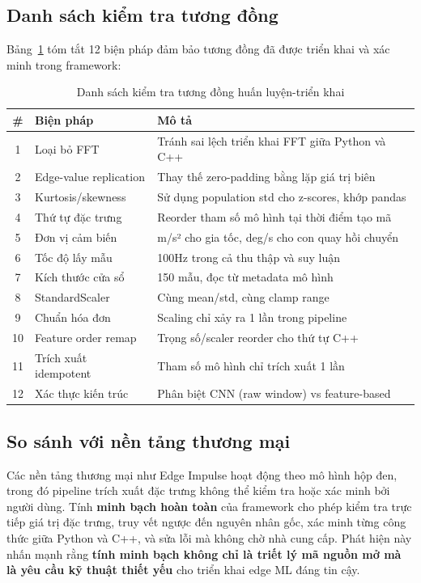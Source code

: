 \subsection{Danh sách kiểm tra tương đồng}
Bảng~\ref{tab:parity_checklist} tóm tắt 12 biện pháp đảm bảo tương đồng đã được triển khai và xác minh trong framework:

\begin{table}[H]
    \centering
    \caption{Danh sách kiểm tra tương đồng huấn luyện-triển khai}
    \small
    \begin{tabular}{@{}clp{7cm}@{}}
        \toprule
        \# & Biện pháp & Mô tả \\
        \midrule
        1 & Loại bỏ FFT & Tránh sai lệch triển khai FFT giữa Python và C++ \\
        2 & Edge-value replication & Thay thế zero-padding bằng lặp giá trị biên \\
        3 & Kurtosis/skewness & Sử dụng population std cho z-scores, khớp pandas \\
        4 & Thứ tự đặc trưng & Reorder tham số mô hình tại thời điểm tạo mã \\
        5 & Đơn vị cảm biến & m/s² cho gia tốc, deg/s cho con quay hồi chuyển \\
        6 & Tốc độ lấy mẫu & 100Hz trong cả thu thập và suy luận \\
        7 & Kích thước cửa sổ & 150 mẫu, đọc từ metadata mô hình \\
        8 & StandardScaler & Cùng mean/std, cùng clamp range \\
        9 & Chuẩn hóa đơn & Scaling chỉ xảy ra 1 lần trong pipeline \\
        10 & Feature order remap & Trọng số/scaler reorder cho thứ tự C++ \\
        11 & Trích xuất idempotent & Tham số mô hình chỉ trích xuất 1 lần \\
        12 & Xác thực kiến trúc & Phân biệt CNN (raw window) vs feature-based \\
        \bottomrule
    \end{tabular}
    \label{tab:parity_checklist}
\end{table}

\subsection{So sánh với nền tảng thương mại}
Các nền tảng thương mại như Edge Impulse hoạt động theo mô hình hộp đen, trong đó pipeline trích xuất đặc trưng không thể kiểm tra hoặc xác minh bởi người dùng. Tính \textbf{minh bạch hoàn toàn} của framework cho phép kiểm tra trực tiếp giá trị đặc trưng, truy vết ngược đến nguyên nhân gốc, xác minh từng công thức giữa Python và C++, và sửa lỗi mà không chờ nhà cung cấp. Phát hiện này nhấn mạnh rằng \textbf{tính minh bạch không chỉ là triết lý mã nguồn mở mà là yêu cầu kỹ thuật thiết yếu} cho triển khai edge ML đáng tin cậy.


